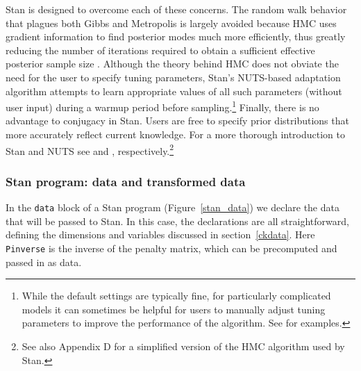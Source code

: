 Stan is designed to overcome each of these concerns. The random walk behavior that plagues both 
Gibbs and Metropolis is largely avoided because HMC uses gradient information to find posterior modes 
much more efficiently, thus greatly reducing the number of iterations required to obtain a sufficient 
effective posterior sample size . 
Although the theory behind HMC does 
not obviate the need for the user to specify tuning parameters, Stan's NUTS-based adaptation algorithm 
attempts to learn appropriate values of all such parameters (without user input) during a warmup 
period before sampling.\footnote{While the default settings are typically fine, for particularly complicated 
models it can sometimes be helpful for users to manually adjust tuning parameters to improve the 
performance of the algorithm. See  for examples.} 
Finally, there is no advantage to conjugacy in Stan. 
Users are free to specify prior distributions that more accurately reflect current knowledge. 
For a more thorough introduction to Stan and NUTS see  
and , respectively.\footnote{See also Appendix D %
for a simplified version of the HMC algorithm used by Stan.}

\subsubsection{Stan program: data and transformed data}

In the {\tt data} block of a Stan program (Figure~\ref{stan_data}) we declare the data that will 
be passed to Stan. In this case, the declarations are all straightforward, defining the dimensions 
and variables discussed in section~\ref{ckdata}. Here {\tt Pinverse} is the inverse of 
the penalty matrix, which can be precomputed and passed in as data.

